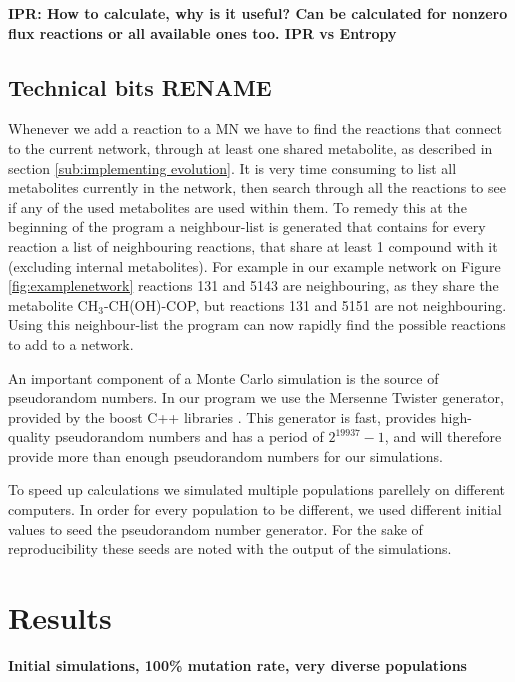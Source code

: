 \documentclass[10pt,a4paper]{article}
\begin{document}
\textbf{IPR: How to calculate, why is it useful? Can be calculated for nonzero flux reactions or all available ones too. IPR vs Entropy}






\subsection{Technical bits RENAME}
\label{sub:technical_bits}

	Whenever we add a reaction to a MN we have to find the reactions that connect to the current network, through at least one shared metabolite, as described in section \ref{sub:implementing evolution}. It is very time consuming to list all metabolites currently in the network, then search through all the reactions to see if any of the used metabolites are used within them. To remedy this at the beginning of the program a neighbour-list is generated that contains for every reaction a list of neighbouring reactions, that share at least 1 compound with it (excluding internal metabolites). For example in our example network on Figure \ref{fig:examplenetwork} reactions 131 and 5143 are neighbouring, as they share the metabolite CH$_3$-CH(OH)-COP, but reactions 131 and 5151 are not neighbouring. Using this neighbour-list the program can now rapidly find the possible reactions to add to a network. 

	An important component of a Monte Carlo simulation is the source of pseudorandom numbers. In our program we use the Mersenne Twister \cite{mersennetwister} generator, provided by the boost C++ libraries \cite{boostlibraries}. This generator is fast, provides high-quality pseudorandom numbers and has a period of $2^{19937}-1$, and will therefore provide more than enough pseudorandom numbers for our simulations.

	To speed up calculations we simulated multiple populations parellely on different computers. In order for every population to be different, we used different initial values to seed the pseudorandom number generator. For the sake of reproducibility these seeds are noted with the output of the simulations. 


\section{Results}
\label{sec:results}

\textbf{Initial simulations, 100\% mutation rate, very diverse populations}
\end{document}
